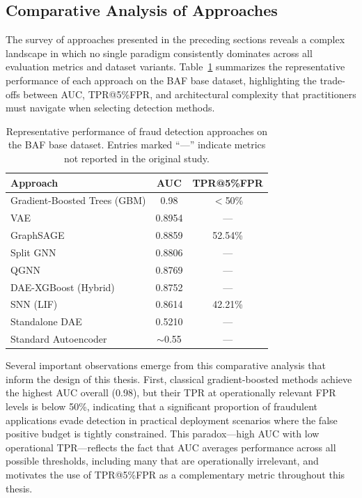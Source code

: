 \subsection{Comparative Analysis of Approaches}

The survey of approaches presented in the preceding sections reveals a complex
landscape in which no single paradigm consistently dominates across all
evaluation metrics and dataset variants. Table~\ref{tab:litreview-comparison}
summarizes the representative performance of each approach on the BAF base
dataset, highlighting the trade-offs between AUC, TPR@5\%FPR, and architectural
complexity that practitioners must navigate when selecting detection methods.

\begin{table}[htbp]
\centering
\caption{Representative performance of fraud detection approaches on the BAF
base dataset. Entries marked ``---'' indicate metrics not reported in the
original study.}
\label{tab:litreview-comparison}
\begin{tabular}{lcc}
\toprule
\textbf{Approach} & \textbf{AUC} & \textbf{TPR@5\%FPR} \\
\midrule
Gradient-Boosted Trees (GBM) & 0.98 & $<$50\% \\
VAE & 0.8954 & --- \\
GraphSAGE & 0.8859 & 52.54\% \\
Split GNN & 0.8806 & --- \\
QGNN & 0.8769 & --- \\
DAE-XGBoost (Hybrid) & 0.8752 & --- \\
SNN (LIF) & 0.8614 & 42.21\% \\
Standalone DAE & 0.5210 & --- \\
Standard Autoencoder & $\sim$0.55 & --- \\
\bottomrule
\end{tabular}
\end{table}

Several important observations emerge from this comparative analysis that inform
the design of this thesis. First, classical gradient-boosted methods achieve the
highest AUC overall (0.98), but their TPR at operationally relevant FPR levels
is below 50\%, indicating that a significant proportion of fraudulent
applications evade detection in practical deployment scenarios where the false
positive budget is tightly constrained. This paradox---high AUC with low
operational TPR---reflects the fact that AUC averages performance across all
possible thresholds, including many that are operationally irrelevant, and
motivates the use of TPR@5\%FPR as a complementary metric throughout this
thesis.

